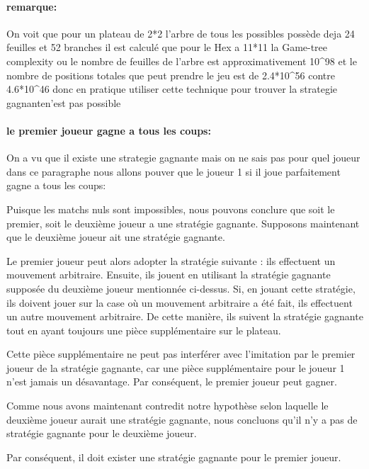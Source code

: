 \paragraph {remarque:}
On voit que pour un plateau de 2*2 l'arbre de tous les possibles possède deja 24 feuilles et 52 branches
il est calculé que pour le Hex a 11*11 la Game-tree complexity ou le nombre de feuilles de l'arbre est
approximativement 10^98 et le nombre de positions totales que peut prendre le jeu est de 2.4*10^56 contre
4.6*10^46 donc en pratique utiliser cette technique pour trouver la strategie gagnanten'est pas possible


\paragraph {le premier joueur gagne a tous les coups:}
On a vu que il existe une strategie gagnante mais on ne sais pas pour quel joueur dans ce paragraphe nous allons
pouver que le joueur 1 si il joue parfaitement gagne a tous les coups:

Puisque les matchs nuls sont impossibles, nous pouvons conclure que soit le premier, soit le deuxième joueur a une stratégie
gagnante. Supposons maintenant que le deuxième joueur ait une stratégie gagnante.

Le premier joueur peut alors adopter la stratégie suivante : ils effectuent un mouvement arbitraire. Ensuite, 
ils jouent en utilisant la stratégie gagnante supposée du deuxième joueur mentionnée ci-dessus. Si,
en jouant cette stratégie, ils doivent jouer sur la case où un mouvement arbitraire a été fait, ils effectuent
un autre mouvement arbitraire. De cette manière, ils suivent la stratégie gagnante tout en ayant toujours une pièce
supplémentaire sur le plateau.

Cette pièce supplémentaire ne peut pas interférer avec l'imitation par le premier joueur de la stratégie gagnante, 
car une pièce supplémentaire pour le joueur 1 n'est jamais un désavantage. Par conséquent, le premier joueur peut
gagner.

Comme nous avons maintenant contredit notre hypothèse selon laquelle le deuxième joueur aurait une stratégie gagnante,
nous concluons qu'il n'y a pas de stratégie gagnante pour le deuxième joueur.

Par conséquent, il doit exister une stratégie gagnante pour le premier joueur.